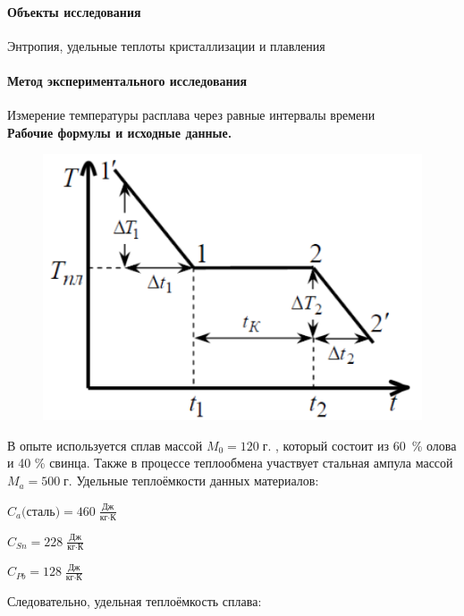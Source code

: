 \documentclass[a4paper]{article}
\begin{document}
\paragraph{Объекты исследования} Энтропия, удельные теплоты кристаллизации и плавления
\paragraph{Метод экспериментального исследования} Измерение температуры расплава через равные интервалы времени\\

 \textbf{Рабочие формулы и исходные данные.}

 	\begin{figure}[htb]
 		
 		 \begin{center}
 	 \includegraphics[scale=0.3]{plot}
 	   \end{center}
    \caption{}
 	\end{figure}


 В опыте используется сплав массой $ M_0=120\;\mbox{г.}$ , который состоит из 60~\% олова и 40 \% свинца. Также в процессе теплообмена участвует стальная  ампула массой $ M_a = 500\;\mbox{г.}$ Удельные теплоёмкости данных материалов:
 
 $ C_a\mbox{(сталь)} = 460\; \frac{\mbox{Дж}}{\mbox{кг} \cdot \mbox{К}}$
 
 $ C_{Sn} = 228\; \frac{\mbox{Дж}}{\mbox{кг} \cdot \mbox{К}}$
 
 $ C_{Pb} = 128\; \frac{\mbox{Дж}}{\mbox{кг} \cdot \mbox{К}}$
 
 Следовательно, удельная теплоёмкость сплава:
 
\end{document}
